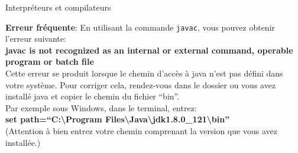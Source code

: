 \begin{section}{Interpréteurs et compilateurs}
\begin{Exercice}[10 minutes]
\begin{solution}
            \textbf{Erreur fréquente}: En utilisant la commande \lstinline{javac}, vous pouvez obtenir l'erreur suivante:\\
            \textbf{javac is not recognized as an internal or external command, operable program or batch file}\\
            Cette erreur se produit lorsque le chemin d'accès à java n'est pas défini dans votre système. Pour corriger cela, rendez-vous dans le dossier ou vous avez installé java et copier le chemin du fichier ``bin''.\\Par exemple sous Windows, dans le terminal, entrez:\\ \textbf{set path=``C:\textbackslash Program Files\textbackslash Java\textbackslash jdk1.8.0\_121\textbackslash bin''}\\(Attention à bien entrez votre chemin comprenant la version que vous avez installée.)

        \end{solution}

    \end{Exercice}
    
\end{section}
